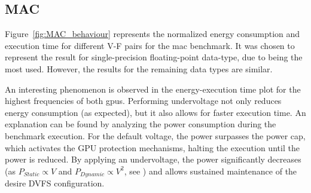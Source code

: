 \subsection{MAC}

\label{sec:MAC_behaviour}
Figure~\ref{fig:MAC_behaviour} represents the normalized energy consumption and execution time for different V-F pairs for the \acrshort{mac} benchmark. It was chosen to represent the result for single-precision floating-point data-type, due to being the most used. However, the results for the remaining data types are similar.

An interesting phenomenon is observed in the energy-execution time plot for the highest frequencies of both \acrshort{gpu}s. Performing undervoltage not only reduces energy consumption (as expected), but it also allows for faster execution time. An explanation can be found by analyzing the power consumption during the benchmark execution. For the default voltage, the power surpasses the power cap, which activates the GPU protection mechanisms, halting the execution until the power is reduced. By applying an undervoltage, the power significantly decreases (as $P_{Static}\propto V$ and $P_{Dynamic}\propto V^2$, see \cite{guerreiro_gpgpu_2018}) and allows sustained maintenance of the desire DVFS configuration. 


